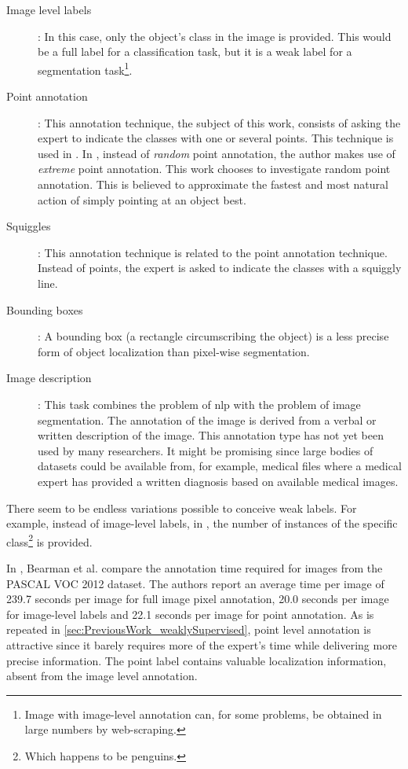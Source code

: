 \begin{description}
    \item[Image level labels]: In this case, only the object's class in the image is provided. 
    This would be a full label for a classification task, but it is a weak label for a segmentation task\footnote{Image with image-level annotation can, for some problems, be obtained in large numbers by web-scraping.}.
    \item[Point annotation]: This annotation technique, the subject of this work, consists of asking the expert to indicate the classes with one or several points. This technique is used in \cite{Laradji2020, Laradji2018, McEver2020}.
    In \cite{Maninis2018}, instead of \textit{random} point annotation, the author makes use of \textit{extreme} point annotation. This work chooses to investigate random point annotation.
    This is believed to approximate the fastest and most natural action of simply pointing at an object best.
    \item[Squiggles]: This annotation technique is related to the point annotation technique. Instead of points, the expert is asked to indicate the classes with a squiggly line.
    \item[Bounding boxes]: A bounding box (a rectangle circumscribing the object) is a less precise form of object localization than pixel-wise segmentation.
    \item[Image description]: This task combines the problem of \acrlong{nlp} with the problem of image segmentation. The annotation of the image is derived from a verbal or written description of the image. 
    This annotation type has not yet been used by many researchers. 
    It might be promising since large bodies of datasets could be available from, for example, medical files where a medical expert has provided a written diagnosis based on available medical images. 
\end{description}
\par{
    There seem to be endless variations possible to conceive weak labels. 
    For example, instead of image-level labels, in \cite{Laradji2018}, the number of instances of the specific class\footnote{Which happens to be penguins.} is provided. 
}
\par{
    In \cite{Bearman2015}, Bearman et al. compare the annotation time required for images from the PASCAL VOC 2012 dataset.
    The authors report an average time per image of 239.7 seconds per image for full image pixel annotation, 20.0 seconds per image for image-level labels and 22.1 seconds per image for point annotation.
    As is repeated in \ref{sec:PreviousWork_weaklySupervised}, point level annotation is attractive since it barely requires more of the expert's time while delivering more precise information.
    The point label contains valuable localization information, absent from the image level annotation.
}
